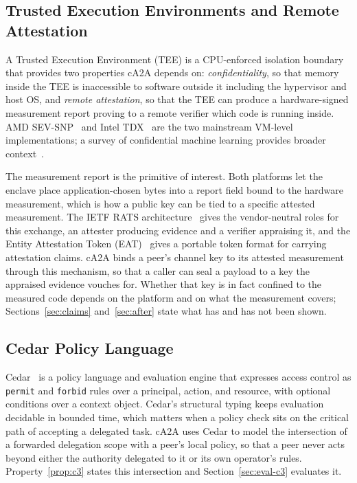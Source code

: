 \subsection{Trusted Execution Environments and Remote Attestation}

A Trusted Execution Environment (TEE) is a CPU-enforced isolation boundary that provides
two properties cA2A depends on: \emph{confidentiality}, so that memory inside the TEE is
inaccessible to software outside it including the hypervisor and host OS, and
\emph{remote attestation}, so that the TEE can produce a hardware-signed measurement report
proving to a remote verifier which code is running inside. AMD SEV-SNP~\citep{amdsevsnp2023}
and Intel TDX~\citep{inteltdx2023} are the two mainstream VM-level implementations; a survey
of confidential machine learning provides broader context~\citep{confai2024}.

The measurement report is the primitive of interest. Both platforms let the enclave place
application-chosen bytes into a report field bound to the hardware measurement, which is how
a public key can be tied to a specific attested measurement. The IETF RATS
architecture~\citep{rats2021} gives the vendor-neutral roles for this exchange, an attester
producing evidence and a verifier appraising it, and the Entity Attestation Token
(EAT)~\citep{eat2023} gives a portable token format for carrying attestation claims. cA2A
binds a peer's channel key to its attested measurement through this mechanism, so that a
caller can seal a payload to a key the appraised evidence vouches for. Whether that key is in
fact confined to the measured code depends on the platform and on what the measurement
covers; Sections~\ref{sec:claims} and~\ref{sec:after} state what has and has not been shown.

\subsection{Cedar Policy Language}

Cedar~\citep{cedar2023} is a policy language and evaluation engine that expresses access
control as \texttt{permit} and \texttt{forbid} rules over a principal, action, and
resource, with optional conditions over a context object. Cedar's structural typing keeps
evaluation decidable in bounded time, which matters when a policy check sits on the
critical path of accepting a delegated task. cA2A uses Cedar to model the intersection of a
forwarded delegation scope with a peer's local policy, so that a peer never acts beyond
either the authority delegated to it or its own operator's rules. Property~\ref{prop:c3}
states this intersection and Section~\ref{sec:eval-c3} evaluates it.

